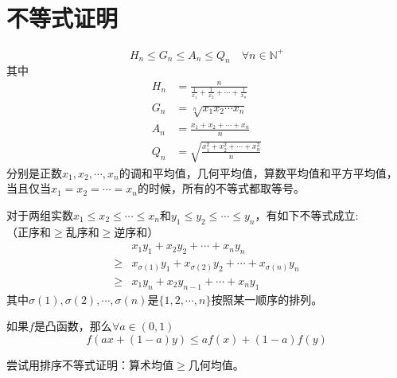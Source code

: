 \section{不等式证明}

\begin{theorem}[均值不等式]
    $$H_n\leq G_n\leq A_n\leq Q_n\quad \forall n \in \mathbb{N}^+$$
    其中
    \begin{align*}
        H_n & = \frac{n}{\frac{1}{x_1}+\frac{1}{x_2}+\cdots+\frac{1}{x_n}} \\
        G_n & = \sqrt[n]{x_1x_2\cdots x_n}                                 \\
        A_n & =  \frac{x_1+x_2+\cdots+x_n}{n}                              \\
        Q_n & =  \sqrt{\frac{x_1^2+x_2^2+\cdots+x_n^2}{n}}
    \end{align*}
    分别是正数$x_1,x_2,\cdots,x_n$的调和平均值，几何平均值，算数平均值和平方平均值，当且仅当$x_1=x_2=\cdots=x_n$的时候，所有的不等式都取等号。
\end{theorem}

\begin{theorem}[排序不等式]
    对于两组实数$x_1\leq x_2 \leq \cdots \leq x_n$和$y_1\leq y_2 \leq \cdots \leq y_n$，有如下不等式成立:\\
    （正序和$\geq$乱序和$\geq$逆序和）
    \begin{align*}
             & x_1y_1+x_2y_2+\cdots+x_ny_n                               \\
        \geq & x_{\sigma(1)}y_1+x_{\sigma(2)}y_2+\cdots+x_{\sigma(n)}y_n \\
        \geq & x_1y_n+x_2y_{n-1}+\cdots+x_ny_1
    \end{align*}
    其中$\sigma(1),\sigma(2),\cdots,\sigma(n)$是$\{1,2,\cdots,n\}$按照某一顺序的排列。
\end{theorem}

\begin{theorem}[Jensen不等式]
    如果$f$是凸函数，那么$\forall a \in (0,1)$
    $$
        f(ax+(1-a)y) \le af(x)+(1-a)f(y)
    $$
\end{theorem}

\begin{problemset}
    \item 尝试用排序不等式证明：算术均值$\geq$几何均值。
\end{problemset}